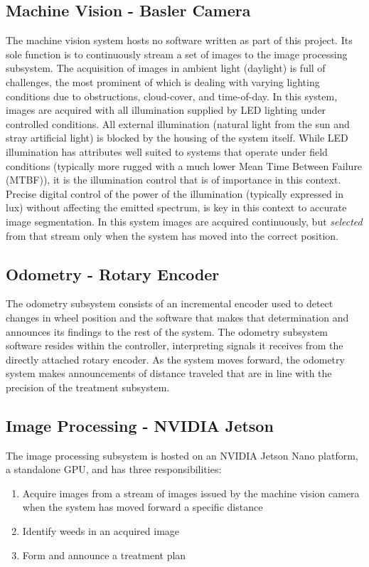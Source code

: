 \documentclass[12pt]{article}
\begin{document}
{\subsection{Machine Vision - Basler Camera}
The machine vision system hosts no software written as part of this project.  Its sole function is to continuously stream a set of images to the image processing subsystem\cite{noauthor_undated-tt}.  The acquisition of images in ambient light (daylight) is full of challenges, the most prominent of which is dealing with varying lighting conditions due to obstructions, cloud-cover, and time-of-day. In this system, images are acquired with all illumination supplied by LED lighting under controlled conditions. All external illumination (natural light from the sun and stray artificial light) is blocked by the housing of the system itself. While LED illumination has attributes well suited to systems that operate under field conditions (typically more rugged with a much lower Mean Time Between Failure (MTBF)), it is the illumination control that is of importance in this context.  Precise digital control of the power of the illumination (typically expressed in lux) without affecting the emitted spectrum, is key in this context to accurate image segmentation. In this system images are acquired continuously, but \textit{selected} from that stream only when the system has moved into the correct position.

\subsection{Odometry - Rotary Encoder}
\label{sec:odometry}
The odometry subsystem consists of an incremental encoder used to detect changes in wheel position and the software that makes that determination and announces its findings to the rest of the system. The odometry subsystem software resides within the controller, interpreting signals it receives from the directly attached rotary encoder. As the system moves forward, the odometry system makes announcements of distance traveled that are in line with the precision of the treatment subsystem. 

\subsection{Image Processing - NVIDIA Jetson}
The image processing subsystem is hosted on an NVIDIA Jetson Nano platform, a standalone GPU, and has three responsibilities:
\begin{enumerate}
\item{Acquire images from a stream of images issued by the machine vision camera when the system has moved forward a specific distance}
\item{Identify weeds in an acquired image}
\item{Form and announce a treatment plan}
\end{enumerate} 

}
\end{document}
